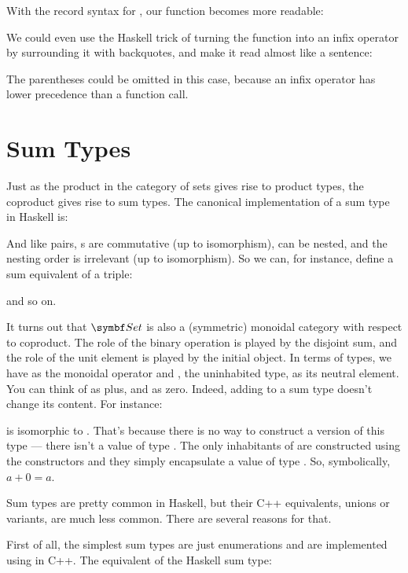 With the record syntax for , our function
 becomes more readable:

We could even use the Haskell trick of turning the function
 into an infix operator by surrounding it with
backquotes, and make it read almost like a sentence:

The parentheses could be omitted in this case, because an infix operator
has lower precedence than a function call.

\section{Sum Types}

Just as the product in the category of sets gives rise to product types,
the coproduct gives rise to sum types. The canonical implementation of a
sum type in Haskell is:

And like pairs, s are commutative (up to isomorphism),
can be nested, and the nesting order is irrelevant (up to isomorphism).
So we can, for instance, define a sum equivalent of a triple:

and so on.

It turns out that $\Set$ is also a (symmetric) monoidal category
with respect to coproduct. The role of the binary operation is played by
the disjoint sum, and the role of the unit element is played by the
initial object. In terms of types, we have  as the
monoidal operator and , the uninhabited type, as its
neutral element. You can think of  as plus, and
 as zero. Indeed, adding  to a sum type
doesn't change its content. For instance:

is isomorphic to . That's because there is no way to construct
a  version of this type --- there isn't a value of type
. The only inhabitants of  are
constructed using the  constructors and they simply
encapsulate a value of type . So, symbolically, $a + 0 = a$.

Sum types are pretty common in Haskell, but their C++ equivalents,
unions or variants, are much less common. There are several reasons for
that.

First of all, the simplest sum types are just enumerations and are
implemented using  in C++. The equivalent of the Haskell
sum type:

